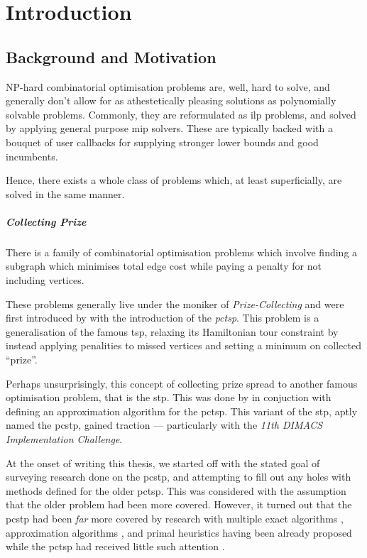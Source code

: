 \chapter{Introduction}
\section{Background and Motivation}\label{sec:intro:background}
NP-hard combinatorial optimisation problems are, well, hard to solve, and generally
don't allow for as athestetically pleasing solutions as polynomially solvable problems.
Commonly, they are reformulated as \gls{ilp} problems, and solved by
applying general purpose
\gls{mip} solvers. These are typically backed
with a bouquet of user callbacks for supplying
stronger lower bounds and good incumbents.

Hence, there exists a whole class of problems which, at least superficially, are
solved in the same manner.

\paragraph{Collecting Prize}
There is a family of combinatorial optimisation problems which involve
finding a subgraph which minimises total edge cost while paying a penalty
for not including vertices.

These problems generally live under the moniker of \textit{Prize-Collecting}
and were first introduced by \citet*{balas1989prize}
with the introduction of the \textit{\gls{pctsp}}. This problem is a generalisation of
the famous \gls{tsp}, relaxing its Hamiltonian tour constraint by instead applying penalities
to missed vertices and setting a minimum on collected ``prize''.

Perhaps unsurprisingly, this concept of collecting prize spread to another famous optimisation
problem, that is the \gls{stp}. This was done by \citet{Bienstock1993} in conjuction with
defining an approximation algorithm for the \gls{pctsp}. This variant of the \gls{stp},
aptly named the \gls{pcstp}, gained traction --- particularly with the
\textit{11th DIMACS Implementation Challenge}\citep{DIMACS}.

At the onset of writing this thesis, we started off with the stated
goal of surveying research done
on the \gls{pcstp}, and attempting to fill out any holes with methods defined for the older
\gls{pctsp}. This was considered with the assumption that the older problem had
been more covered.
However, it turned out that the \gls{pcstp} had been \textit{far} more covered
by research with multiple exact algorithms
\citep{ljubic2005solving, leitner2016dual, gamrath2017scip},
approximation algorithms \citep{Bienstock1993,goemans1995general,Johnson:2000:PCS:338219.338637},
and primal heuristics \citep{canuto2001local,fu2014knowledge,akhmedov2016divide}
having been already proposed while the \gls{pctsp} had received little such attention
\citep{archetti2014chapter}.

